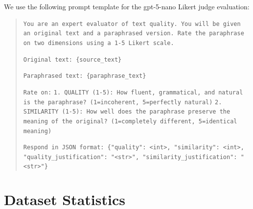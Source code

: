 \documentclass[11pt]{article}
\begin{document}
We use the following prompt template for the gpt-5-nano Likert judge evaluation:

\begin{quote}
\small
\texttt{You are an expert evaluator of text quality. You will be given an original text and a paraphrased version. Rate the paraphrase on two dimensions using a 1-5 Likert scale.}

\texttt{Original text: \{source\_text\}}

\texttt{Paraphrased text: \{paraphrase\_text\}}

\texttt{Rate on:}
\texttt{1. QUALITY (1-5): How fluent, grammatical, and natural is the paraphrase? (1=incoherent, 5=perfectly natural)}
\texttt{2. SIMILARITY (1-5): How well does the paraphrase preserve the meaning of the original? (1=completely different, 5=identical meaning)}

\texttt{Respond in JSON format: \{"quality": <int>, "similarity": <int>, "quality\_justification": "<str>", "similarity\_justification": "<str>"\}}
\end{quote}

\section{Dataset Statistics}
\label{app:dataset}

\begin{table}[t]
\centering
\footnotesize
\setlength{\tabcolsep}{3pt}
\caption{Dataset statistics for training and evaluation. The Likert evaluation uses 500 AI samples per attack method (M1--M5) with matched sample IDs.}
\label{tab:dataset}
\end{table}
\end{document}
